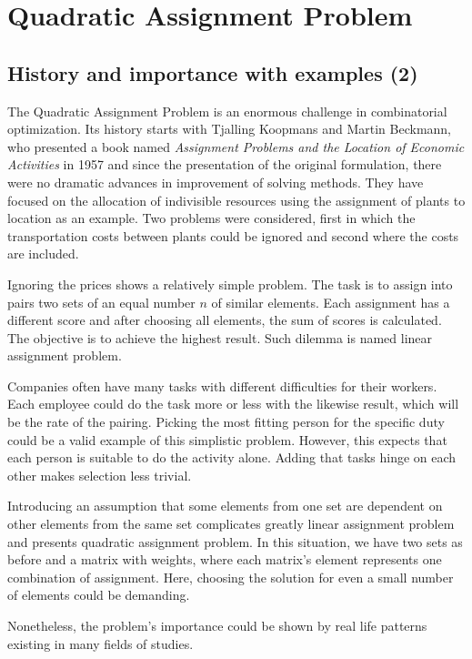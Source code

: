 \section{Quadratic Assignment Problem}
\label{section:background_qap}

\subsection{History and importance with examples (2)}
The Quadratic Assignment Problem is an enormous challenge in combinatorial optimization.
Its history starts with Tjalling Koopmans and Martin Beckmann, who presented a book named \textit{Assignment Problems and the Location of Economic Activities} in 1957 \cite{koopmans-beckmann1957} and since the presentation of the original formulation, there were no dramatic advances in improvement of solving methods.
They have focused on the allocation of indivisible resources using the assignment of plants to location as an example.
Two problems were considered, first in which the transportation costs between plants could be ignored and second where the costs are included.

Ignoring the prices shows a relatively simple problem.
The task is to assign into pairs two sets of an equal number $n$ of similar elements.
Each assignment has a different score and after choosing all elements, the sum of scores is calculated.
The objective is to achieve the highest result.
Such dilemma is named linear assignment problem.

Companies often have many tasks with different difficulties for their workers.
Each employee could do the task more or less with the likewise result, which will be the rate of the pairing.
Picking the most fitting person for the specific duty could be a valid example of this simplistic problem.
However, this expects that each person is suitable to do the activity alone.
Adding that tasks hinge on each other makes selection less trivial.

Introducing an assumption that some elements from one set are dependent on other elements from the same set complicates greatly linear assignment problem and presents quadratic assignment problem.
In this situation, we have two sets as before and a matrix with weights, where each matrix's element represents one combination of assignment.
Here, choosing the solution for even a small number of elements could be demanding.

Nonetheless, the problem's importance could be shown by real life patterns existing in many fields of studies.

